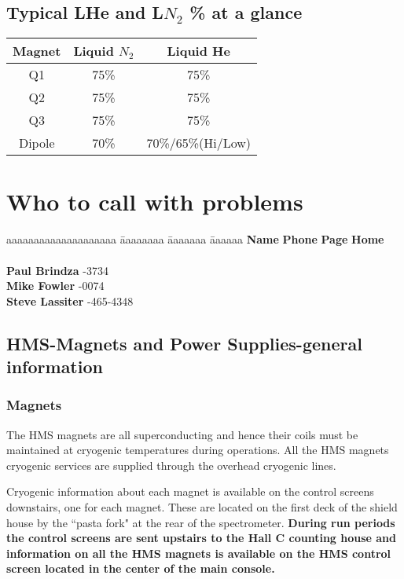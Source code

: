 \documentclass[12pt,epsf,here]{article}
\begin{document}
\subsection{Typical LHe and L$N_2$ \% at a glance}

\begin{tabular}{|c|c|c|} \hline
Magnet&Liquid $N_{2}$&Liquid He \\ \hline
Q1&75\%&75\% \\ \hline
Q2&75\%&75\% \\ \hline
Q3&75\%&75\% \\ \hline
Dipole&70\%&70\%/65\%(Hi/Low)\\ \hline
\end{tabular}

\section{Who to call with problems}
\begin{tabbing}
aaaaaaaaaaaaaaaaaaaa \=aaaaaaaa \=aaaaaaa \=aaaaaa    \kill
\textbf{Name}    \> \textbf{Phone}   \>\textbf{Page}   \> \textbf{Home}\\
\\
\textbf{Paul Brindza}   -3734\\
\textbf{Mike Fowler}   -0074\\
\textbf{Steve Lassiter}   -465-4348\\
\end{tabbing}


\subsection{HMS-Magnets and Power Supplies-general information}

\subsubsection{Magnets}
The HMS magnets are all superconducting and hence their coils must be
maintained at cryogenic temperatures during operations. All the HMS
magnets cryogenic services are supplied through the overhead cryogenic
lines. 

Cryogenic information about each magnet is available on the control
screens downstairs, one for each magnet. These are located on the first
deck of the shield house by the ``pasta fork" at the rear of the
spectrometer. \textbf{During run periods the control screens are sent
upstairs to the Hall C counting house and information on all the HMS
magnets is available on the HMS control screen located in the center of
the main console.}
\end{document}
